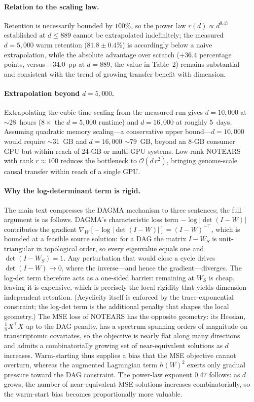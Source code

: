 \documentclass[11pt]{article}
\renewcommand{\to}{\ensuremath{\rightarrow}\allowbreak}
\begin{document}
\paragraph{Relation to the scaling law.} Retention is necessarily bounded by $100\%$, so
the power law $r(d)\propto d^{0.47}$ established at $d\le889$ cannot be extrapolated
indefinitely; the measured $d=5{,}000$ warm retention ($81.8\pm0.4\%$) is accordingly below
a naive extrapolation, while the absolute advantage over scratch ($+36.4$ percentage
points, versus $+34.0$~pp at $d=889$, the value in Table~2) remains substantial and consistent with the trend of
growing transfer benefit with dimension.

\paragraph{Extrapolation beyond $d=5{,}000$.} Extrapolating the cubic time scaling from
the measured run gives $d=10{,}000$ at $\sim$28~hours ($8\times$ the $d=5{,}000$ runtime)
and $d=16{,}000$ at roughly 5~days. Assuming quadratic memory scaling---a conservative
upper bound---$d=10{,}000$ would require $\sim$31~GB and $d=16{,}000$ $\sim$79~GB, beyond
an 8-GB consumer GPU but within reach of 24-GB or multi-GPU systems. Low-rank NOTEARS with
rank $r\approx100$ reduces the bottleneck to $\mathcal{O}(d\,r^2)$, bringing genome-scale
causal transfer within reach of a single GPU.

\paragraph{Why the log-determinant term is rigid.} The main text compresses the
DAGMA mechanism to three sentences; the full argument is as follows. DAGMA's
characteristic loss term $-\log|\det(I-W)|$ contributes the gradient
$\nabla_W[-\log|\det(I-W)|]=(I-W)^{-\top}$, which is bounded at a feasible source
solution: for a DAG the matrix $I-W_S$ is unit-triangular in topological order, so
every eigenvalue equals one and $\det(I-W_S)=1$. Any perturbation that would close a
cycle drives $\det(I-W)\to 0$, where the inverse---and hence the gradient---diverges.
The log-det term therefore acts as a one-sided barrier: remaining at $W_S$ is cheap,
leaving it is expensive, which is precisely the local rigidity that yields
dimension-independent retention. (Acyclicity itself is enforced by the
trace-exponential constraint; the log-det term is the additional penalty that shapes
the local geometry.) The MSE loss of NOTEARS has the opposite geometry: its Hessian,
$\tfrac{1}{n}X^\top X$ up to the DAG penalty, has a spectrum spanning orders of
magnitude on transcriptomic covariates, so the objective is nearly flat along many
directions and admits a combinatorially growing set of near-equivalent solutions as
$d$ increases. Warm-starting thus supplies a bias that the MSE objective cannot
overturn, whereas the augmented Lagrangian term $h(W)^2$ exerts only gradual pressure
toward the DAG constraint. The power-law exponent $0.47$ follows: as $d$ grows, the
number of near-equivalent MSE solutions increases combinatorially, so the warm-start
bias becomes proportionally more valuable.
\end{document}

